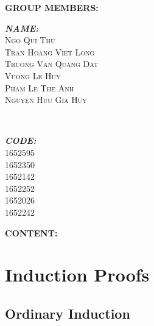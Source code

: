 \documentclass[11pt]{article}
\begin{document}
\begin{center}
{\huge\bfseries GROUP MEMBERS:}\\[1cm]

\end{center}
	\begin{minipage}{0.5\textwidth}
		\begin{flushleft}
			\large
			\textit{{\huge\bfseries NAME:}\\[0.5cm]}
			 \textsc{{Ngo Qui Thu}\\[0.2cm]}
			 \textsc{{Tran Hoang Viet Long}\\[0.2cm]}
			 \textsc{{Truong Van Quang Dat}\\[0.2cm]}
			 \textsc{{Vuong Le Huy}\\[0.2cm]}
			 \textsc{{Pham Le The Anh}\\[0.2cm]}
			 \textsc{{Nguyen Huu Gia Huy}\\[0.2cm]}
		\end{flushleft}
	\end{minipage}
	~
	\begin{minipage}{0.5\textwidth}
		\begin{flushright}
			\large
			\textit{{\huge\bfseries CODE:}\\[0.5cm]}
			 \textsc{{1652595}\\[0.2cm]}
			 \textsc{{1652350}\\[0.2cm]}
			 \textsc{{1652142}\\[0.2cm]}
			 \textsc{{1652252}\\[0.2cm]}
			 \textsc{{1652026}\\[0.2cm]}
			 \textsc{{1652242}\\[0.2cm]}
		\end{flushright}
	\end{minipage}
\clearpage

{\huge\bfseries CONTENT:}\\[1cm]	
	\section{Induction Proofs}
	\subsection{Ordinary Induction}
	
\end{document}
